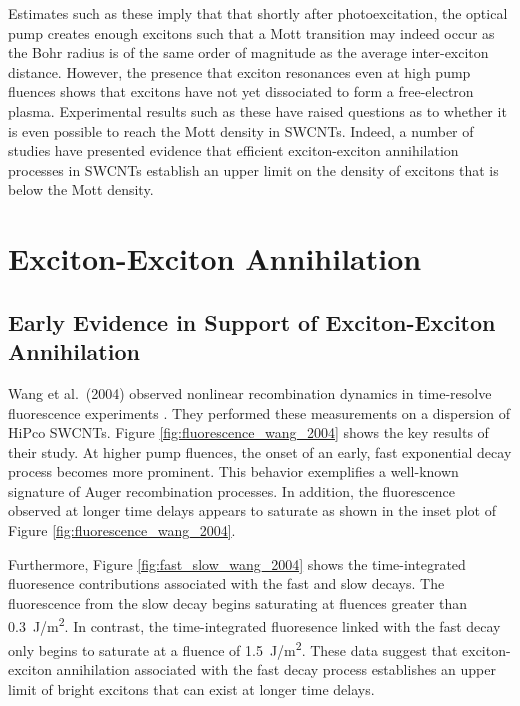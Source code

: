 Estimates such as these imply that that shortly after photoexcitation, the optical pump creates enough excitons such that a Mott transition may indeed occur as the Bohr radius is of the same order of magnitude as the average inter-exciton distance. However, the presence that exciton resonances even at high pump fluences shows that excitons have not yet dissociated to form a free-electron plasma. Experimental results such as these have raised questions as to whether it is even possible to reach the Mott density in SWCNTs. Indeed, a number of studies have presented evidence that efficient exciton-exciton annihilation processes in SWCNTs establish an upper limit on the density of excitons that is below the Mott density.


\section{Exciton-Exciton Annihilation}

\subsection{Early Evidence in Support of Exciton-Exciton Annihilation}

Wang et al.\ (2004) observed nonlinear recombination dynamics in time-resolve fluorescence experiments \cite{wang2004observation}. They performed these measurements on a dispersion of HiPco SWCNTs. Figure \ref{fig:fluorescence_wang_2004} shows the key results of their study. At higher pump fluences, the onset of an early, fast exponential decay process becomes more prominent. This behavior exemplifies a well-known signature of Auger recombination processes. In addition, the fluorescence observed at longer time delays appears to saturate as shown in the inset plot of Figure \ref{fig:fluorescence_wang_2004}.

Furthermore, Figure \ref{fig:fast_slow_wang_2004} shows the time-integrated fluoresence contributions associated with the fast and slow decays. The fluorescence from the slow decay begins saturating at fluences greater than \SI{0.3}{\joule / \meter\squared}. In contrast, the time-integrated fluoresence linked with the fast decay only begins to saturate at a fluence of \SI{1.5}{\joule / \meter\squared}. These data suggest that exciton-exciton annihilation associated with the fast decay process establishes an upper limit of bright excitons that can exist at longer time delays.

